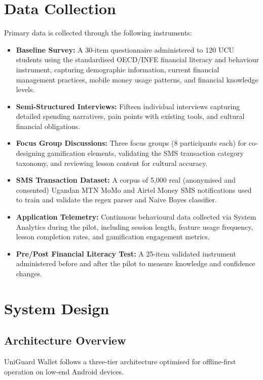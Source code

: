 \documentclass[12pt]{report}
\begin{document}
\section{Data Collection}

Primary data is collected through the following instruments:

\begin{itemize}
    \item \textbf{Baseline Survey:} A 30-item questionnaire administered to 120 UCU students using the standardised OECD/INFE financial literacy and behaviour instrument, capturing demographic information, current financial management practices, mobile money usage patterns, and financial knowledge levels.
    \item \textbf{Semi-Structured Interviews:} Fifteen individual interviews capturing detailed spending narratives, pain points with existing tools, and cultural financial obligations.
    \item \textbf{Focus Group Discussions:} Three focus groups (8 participants each) for co-designing gamification elements, validating the SMS transaction category taxonomy, and reviewing lesson content for cultural accuracy.
    \item \textbf{SMS Transaction Dataset:} A corpus of 5,000 real (anonymised and consented) Ugandan MTN MoMo and Airtel Money SMS notifications used to train and validate the regex parser and Naive Bayes classifier.
    \item \textbf{Application Telemetry:} Continuous behavioural data collected via System Analytics during the pilot, including session length, feature usage frequency, lesson completion rates, and gamification engagement metrics.
    \item \textbf{Pre/Post Financial Literacy Test:} A 25-item validated instrument administered before and after the pilot to measure knowledge and confidence changes.
\end{itemize}

\section{System Design}

\subsection{Architecture Overview}

UniGuard Wallet follows a three-tier architecture optimised for offline-first operation
on low-end Android devices.
\end{document}
